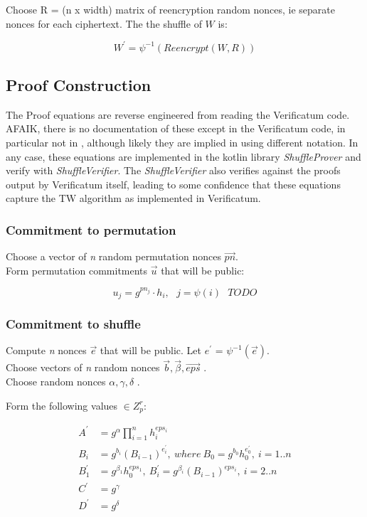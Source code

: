 \documentclass{article}
\begin{document}
Choose R = (n x width) matrix of reencryption random nonces, ie separate
nonces for each ciphertext. The the shuffle of $W$ is:

\[
W^{\prime} = \psi^{-1}(Reencrypt(W, R))
\]



\subsection*{Proof Construction}

The Proof equations are reverse engineered from reading the Verificatum
code. AFAIK, there is no documentation of these except in the Verificatum
code, in particular not in \cite{Wikstr22}, although likely they are implied
in \cite{Wikstr10} using different notation. In any case, these equations
are implemented in the kotlin library \emph{ShuffleProver} and verify
with \emph{ShuffleVerifier}. The \emph{ShuffleVerifier} also verifies
against the proofs output by Verificatum itself, leading to some confidence
that these equations capture the TW algorithm as implemented in Verificatum.

\subsubsection*{Commitment to permutation}

Choose a vector of \emph{n} random permutation nonces $\vec{pn}$.\\
 Form permutation commitments $\vec{u}$ that will be public:

\[
u_{j}=g^{pn_{j}}\cdot h_{i},\ \ \ j=\psi(i)\ \ \ TODO
\]

\subsubsection*{Commitment to shuffle}

Compute \emph{n} nonces $\vec{e}$ that will be public. Let ${e^{\prime}}$
= $\psi^{-1}(\vec{e})$.\\
 Choose vectors of \emph{n} random nonces $\vec{b},\vec{\beta},\vec{eps}$
.\\
 Choose random nonces $\alpha,\gamma,\delta$ .

Form the following values $\in Z_{p}^{r}$:

\begin{align*}
A^{\prime} & =g^{\alpha}\prod_{i=1}^{n}h_{i}^{eps_{i}}\\
B_{i} & =g^{b_{i}}(B_{i-1})^{e_{i}^{\prime}},\ where\ B_{0}=g^{b_0} h_0^{e_{0}^{\prime}},\ i=1..n\\
B_{1}^{\prime}&=g^{\beta_1} h_0^{eps_1},\ B_{i}^{\prime} =g^{\beta_{i}}(B_{i-1})^{eps_{i}},\ i=2..n\\
C^{\prime} & =g^{\gamma}\\
D^{\prime} & =g^{\delta}\\
\end{align*}
\end{document}
